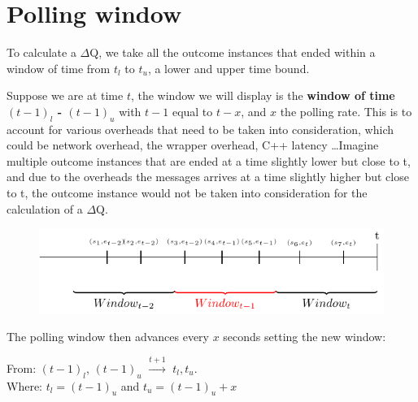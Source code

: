 \section{Polling window}
    To calculate a $\Delta$Q, we take all the outcome instances that ended within a window of time from $t_l$ to $t_u$, a lower and upper time bound.
    
    Suppose we are at time $t$, the window we will display is the  \textbf{window of time $(t-1)_{l}$ - $(t-1)_u$} with $t-1$ equal to $t - x$, and $x$ the polling rate. This is to account for various overheads that need to be taken into consideration, which could be network overhead, the wrapper overhead, C++ latency \dots Imagine multiple outcome instances that are ended at a time slightly lower but close to t, and due to the overheads the messages arrives at a time slightly higher but close to t, the outcome instance would not be taken into consideration for the calculation of a $\Delta$Q.
    
    \begin{figure}[H]
        \begin{center}
            \includegraphics{tikz/window.pdf}
        \end{center}
    \end{figure}

    The polling window then advances every $x$ seconds setting the new window: 
    \begin{center}
        From: $(t-1)_l$, $(t-1)_u$ $\xrightarrow{t + 1}$ $t_l, t_u$. \\
        Where: $t_l = (t-1)_u$ and $t_u = (t-1)_u + x$ 
    \end{center}
